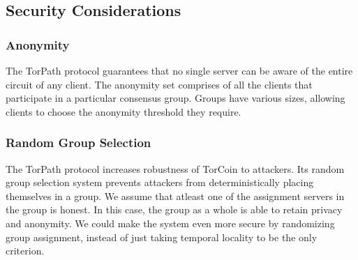 \subsection{Security Considerations} 

\subsubsection{Anonymity} The TorPath protocol guarantees that no single
server can be aware of the entire circuit of any client. The anonymity set
comprises of all the clients that participate in a particular consensus group.
Groups have various sizes, allowing clients to choose the anonymity threshold
they require.

\subsubsection{Random Group Selection} The TorPath protocol increases
robustness of TorCoin to attackers. Its random group selection system prevents
attackers from deterministically placing themselves in a group. We assume that
atleast one of the assignment servers in the group is honest. In this case,
the group as a whole is able to retain privacy and anonymity. We could make
the system even more secure by randomizing group assignment, instead of just
taking temporal locality to be the only criterion.







